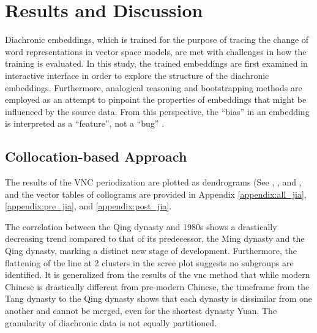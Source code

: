

\chapter{Results and Discussion}
\label{results}

Diachronic embeddings, which is trained for the purpose of tracing the change of word representations in vector space models, are met with challenges in how the training is evaluated. In this study, the trained embeddings are first examined in interactive interface in order to explore the structure of the diachronic embeddings. Furthermore, analogical reasoning and bootstrapping methods are employed as an attempt to pinpoint the properties of embeddings that might be influenced by the source data. From this perspective, the ``bias'' in an embedding is interpreted as a ``feature'', not a ``bug'' \parencite{wevers2020digital}.

\section{Collocation-based Approach}
The results of the VNC periodization are plotted as dendrograms (See , , and , and the vector tables of collograms are provided in Appendix \ref{appendix:all_jia}, \ref{appendix:pre_jia}, and \ref{appendix:post_jia}.

The correlation between the Qing dynasty and 1980s shows a drastically decreasing trend compared to that of its predecessor, the Ming dynasty and the Qing dynasty, marking a distinct new stage of development. Furthermore, the flattening of the line at 2 clusters in the scree plot suggests no subgroups are identified. It is generalized from the results of the \gls{vnc} method that while modern Chinese is drastically different from pre-modern Chinese, the timeframe from the Tang dynasty to the Qing dynasty shows that each dynasty is dissimilar from one another and cannot be merged, even for the shortest dynasty Yuan. The granularity of diachronic data is not equally partitioned.

